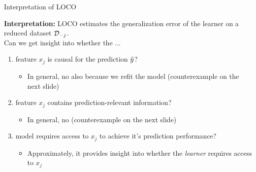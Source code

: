 \documentclass[11pt,compress,t,notes=noshow, aspectratio=169, xcolor=table]{beamer}
\begin{document}
\begin{frame}{Interpretation of LOCO}

\textbf{Interpretation:} LOCO estimates the generalization error of the learner on a reduced dataset $\D_{-j}$.\\
\lz
Can we get insight into whether the ...
\begin{enumerate}
    \item feature $x_j$ is causal for the prediction $\yh$?
    \begin{itemize}
      \item In general, no also because we refit the model (counterexample on the next slide)
    \end{itemize}
    \item feature $x_j$ contains prediction-relevant information?
    \begin{itemize}
      \item In general, no (counterexample on the next slide)
    \end{itemize}
    \item model requires access to $x_j$ to achieve it's prediction performance?
    \begin{itemize}
      \item Approximately, it provides insight into whether the \textit{learner} requires access to $x_j$
    \end{itemize}
\end{enumerate}
\end{frame}
\end{document}
